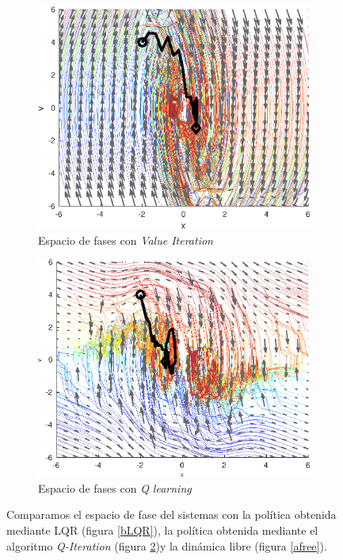 \begin{example}
\begin{figure}
        \begin{subfigure}[b]{0.4\textwidth}
            \includegraphics[width=\textwidth]{img/solpot.eps}
            \caption{Espacio de fases con \emph{Value Iteration}}
            \label{cQI}
        \end{subfigure}
        \begin{subfigure}[b]{0.4\textwidth}
            \includegraphics[width=\textwidth]{img/phase_Qlearning.eps}
            \caption{Espacio de fases con \emph{Q learning}}
            \label{cQI}
        \end{subfigure}
        
        \caption[Espacio de fases modificado]{
        Comparamos el espacio de fase del sistemas con la política obtenida mediante LQR (figura \ref{bLQR}), la política obtenida mediante el algoritmo \emph{Q-Iteration}  (figura \ref{cQI})y la dinámica libre (figura \ref{afree}).  }
        \label{fig:potencial}
    \end{figure}

\end{example}

